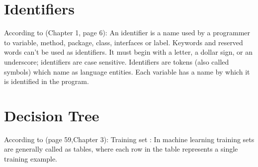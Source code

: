 \documentclass{report}
\begin{document}
\section{Identifiers}
\label{sec:ide}

According to \cite{Roberts2000CompleteJava2Certification}(Chapter 1, page 6): An identifier is a name used by a programmer to variable, method, package, class, interfaces or label. Keywords and reserved words can't be used as  identifiers. It must begin with a letter, a dollar sign, or an underscore; identifiers are case sensitive. Identifiers are tokens (also called symbols) which name as language entities. Each variable has a name by which it is identified in the program.

\section{Decision Tree}
According to \cite{Mitchell1997MachineLearning}(page 59,Chapter 3): Training set : In machine learning training sets are generally called as tables, where each row in the table represents a single training example. 
\end{document}

